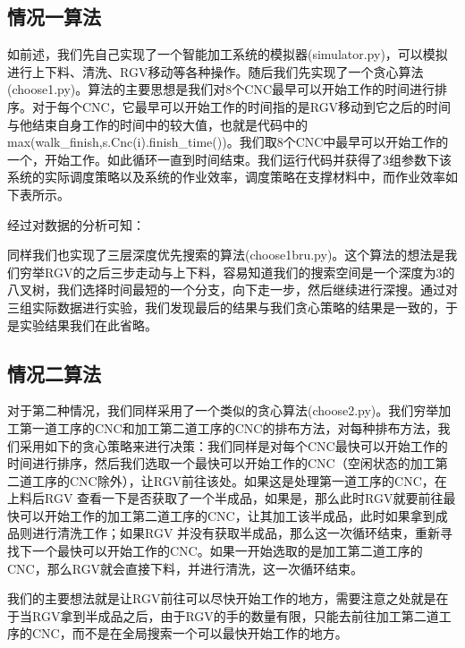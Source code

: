 \documentclass{cumcmthesis}
\begin{document}
\subsection{情况一算法}

如前述，我们先自己实现了一个智能加工系统的模拟器(simulator.py)，可以模拟进行上下料、清洗、RGV移动等各种操作。随后我们先实现了一个贪心算法(choose1.py)。算法的主要思想是我们对8个CNC最早可以开始工作的时间进行排序。对于每个CNC，它最早可以开始工作的时间指的是RGV移动到它之后的时间与他结束自身工作的时间中的较大值，也就是代码中的max(walk_finish,s.Cnc(i).finish_time())。我们取8个CNC中最早可以开始工作的一个，开始工作。如此循环一直到时间结束。我们运行代码并获得了3组参数下该系统的实际调度策略以及系统的作业效率，调度策略在支撑材料中，而作业效率如下表所示。


经过对数据的分析可知：{\color{red}{还有啥}}

同样我们也实现了三层深度优先搜索的算法(choose1bru.py)。这个算法的想法是我们穷举RGV的之后三步走动与上下料，容易知道我们的搜索空间是一个深度为3的八叉树，我们选择时间最短的一个分支，向下走一步，然后继续进行深搜。通过对三组实际数据进行实验，我们发现最后的结果与我们贪心策略的结果是一致的，于是实验结果我们在此省略。


\subsection{情况二算法}

对于第二种情况，我们同样采用了一个类似的贪心算法(choose2.py)。我们穷举加工第一道工序的CNC和加工第二道工序的CNC的排布方法，对每种排布方法，我们采用如下的贪心策略来进行决策：我们同样是对每个CNC最快可以开始工作的时间进行排序，然后我们选取一个最快可以开始工作的CNC（空闲状态的加工第二道工序的CNC除外），让RGV前往该处。如果这是处理第一道工序的CNC，在上料后RGV 查看一下是否获取了一个半成品，如果是，那么此时RGV就要前往最快可以开始工作的加工第二道工序的CNC，让其加工该半成品，此时如果拿到成品则进行清洗工作；如果RGV 并没有获取半成品，那么这一次循环结束，重新寻找下一个最快可以开始工作的CNC。如果一开始选取的是加工第二道工序的CNC，那么RGV就会直接下料，并进行清洗，这一次循环结束。

我们的主要想法就是让RGV前往可以尽快开始工作的地方，需要注意之处就是在于当RGV拿到半成品之后，由于RGV的手的数量有限，只能去前往加工第二道工序的CNC，而不是在全局搜索一个可以最快开始工作的地方。
\end{document}
